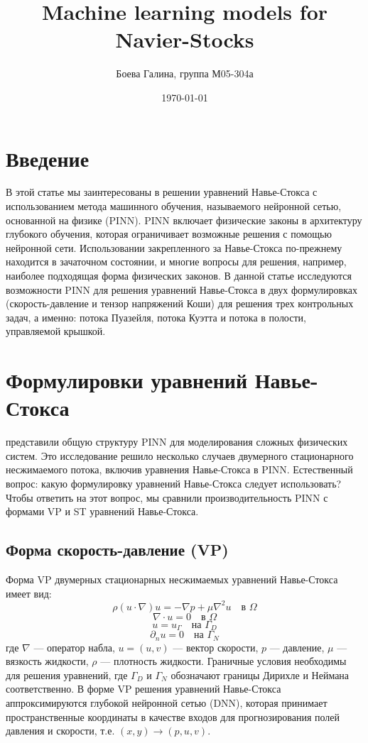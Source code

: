 \documentclass[a4paper,12pt]{article}
\theoremstyle{plain} %
\theoremstyle{definition} %
\theoremstyle{remark} %
\begin{document}
\title{Machine learning models for Navier-Stocks}
\author{Боева Галина, группа М05-304а}
\date{\today}

\maketitle
\section{Введение}
В этой статье мы заинтересованы в решении уравнений Навье-Стокса с использованием
метода машинного обучения, называемого нейронной сетью, основанной на физике (PINN). PINN включает физические
законы в архитектуру глубокого обучения, которая ограничивает возможные решения с помощью нейронной
сети. Использовании закрепленного за Навье-Стокса по-прежнему находится в зачаточном состоянии, и многие
вопросы для решения, например, наиболее подходящая форма физических законов. В данной статье исследуются
возможности PINN для решения уравнений Навье-Стокса в двух формулировках (скорость-давление
и тензор напряжений Коши) для решения трех контрольных задач, а именно: потока Пуазейля, потока
Куэтта и потока в полости, управляемой крышкой.

\section{Формулировки уравнений Навье-Стокса}

\cite{raissi2017physics} представили общую структуру PINN для моделирования сложных физических систем. Это исследование решило несколько случаев двумерного стационарного несжимаемого потока, включив уравнения Навье-Стокса в PINN. Естественный вопрос: какую формулировку уравнений Навье-Стокса следует использовать? Чтобы ответить на этот вопрос, мы сравнили производительность PINN с формами VP и ST уравнений Навье-Стокса.

\subsection{Форма скорость-давление (VP)}

Форма VP двумерных стационарных несжимаемых уравнений Навье-Стокса имеет вид:
\begin{equation}
\rho (u \cdot \nabla) u = -\nabla p + \mu \nabla^2 u \quad \text{в } \Omega
\end{equation}
\[
\nabla \cdot u = 0 \quad \text{в } \Omega
\]
\[
u = u_\Gamma \quad \text{на } \Gamma_D
\]
\[
\partial_n u = 0 \quad \text{на } \Gamma_N
\]
где $\nabla$ — оператор набла, $u = (u, v)$ — вектор скорости, $p$ — давление, $\mu$ — вязкость жидкости, $\rho$ — плотность жидкости. Граничные условия необходимы для решения уравнений, где $\Gamma_D$ и $\Gamma_N$ обозначают границы Дирихле и Неймана соответственно. В форме VP решения уравнений Навье-Стокса аппроксимируются глубокой нейронной сетью (DNN), которая принимает пространственные координаты в качестве входов для прогнозирования полей давления и скорости, т.е. $(x, y) \rightarrow (p, u, v)$.
\end{document}
